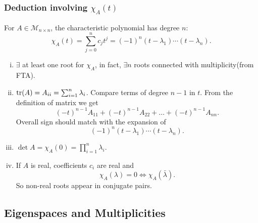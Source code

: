 \documentclass[10pt]{article}
\begin{document}
    \subsubsection{Deduction involving $ \chi_A(t) $}
    For $ A\in \mathcal{M}_{n\times n} $, the characteristic polynomial has degree $n$:
    \[
        \chi_A(t)=\sum_{j=0}^{n}c_jt^j=(-1)^n(t-\lambda_1)\cdots(t-\lambda_n)
    .\]
    \begin{enumerate}[(i)]
        \item $ \exists  $ at least one root for $ \chi_A $, in fact, $ \exists n$ roots connected with multiplicity(from FTA).
        \item $ \tr(A)=A_{ii}=\sum_{i=1}^{n}\lambda_i $. Compare terms of degree $n-1$ in $t$. From the definition of matrix we get 
        \[
            (-t)^{n-1} A_{11}+(-t)^{n-1} A_{22}+\ldots+(-t)^{n-1} A_{n n}
        .\]
        Overall sign should match with the expansion of 
        \[
            (-1)^n(t-\lambda_1)\cdots(t-\lambda_n)
        .\]
        \item $ \det A = \chi_A(0)=\prod_{i=1}^{n}\lambda_i $.
        \item If $A$ is real, coefficients $c_i$ are real and 
        \[
            \chi_A(\lambda)=0 \Longleftrightarrow \chi_A(\bar{\lambda})
        .\]
        So non-real roots appear in conjugate pairs.
    \end{enumerate}
    \subsection{Eigenspaces and Multiplicities}
\end{document}
